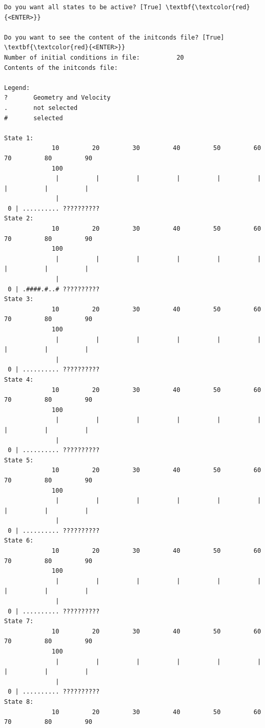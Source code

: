 \documentclass[a4paper,11pt,DIV=15,openany]{scrbook}
\begin{document}
\begin{oframed}
\begin{Verbatim}[commandchars=\\\{\}]
Do you want all states to be active? [True] \textbf{\textcolor{red}{<ENTER>}}

Do you want to see the content of the initconds file? [True] \textbf{\textcolor{red}{<ENTER>}}
Number of initial conditions in file:          20
Contents of the initconds file:

Legend:
?       Geometry and Velocity
.       not selected
#       selected

State 1:
             10         20         30         40         50         60         70         80         90         
             100
              |          |          |          |          |          |          |          |          |          
              |
 0 | .......... ?????????? 
State 2:
             10         20         30         40         50         60         70         80         90         
             100
              |          |          |          |          |          |          |          |          |          
              |
 0 | .####.#..# ?????????? 
State 3:
             10         20         30         40         50         60         70         80         90         
             100
              |          |          |          |          |          |          |          |          |          
              |
 0 | .......... ?????????? 
State 4:
             10         20         30         40         50         60         70         80         90         
             100
              |          |          |          |          |          |          |          |          |          
              |
 0 | .......... ?????????? 
State 5:
             10         20         30         40         50         60         70         80         90         
             100
              |          |          |          |          |          |          |          |          |          
              |
 0 | .......... ?????????? 
State 6:
             10         20         30         40         50         60         70         80         90         
             100
              |          |          |          |          |          |          |          |          |          
              |
 0 | .......... ?????????? 
State 7:
             10         20         30         40         50         60         70         80         90         
             100
              |          |          |          |          |          |          |          |          |          
              |
 0 | .......... ?????????? 
State 8:
             10         20         30         40         50         60         70         80         90         

\end{Verbatim}
\end{oframed}
\end{document}
